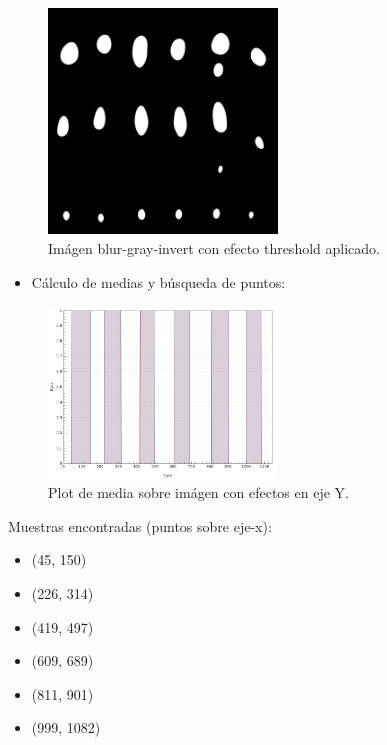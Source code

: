 \begin{figure}[H]
	\vspace{-0.2cm}
	\centering
	\includegraphics[width=230px]{imagenes-jtlc/experimento/search-samples/4-threshold}
	\centering
	\caption{Im\'agen blur-gray-invert con efecto threshold aplicado.}
	\label{fig:font-c-thresh}
	\vspace{-0.15cm}
\end{figure}

\newpage
\begin{itemize}
	\item C\'alculo de medias y b\'usqueda de puntos:
\end{itemize}

\begin{figure}[H]
	\vspace{-0.2cm}
	\centering
	\includegraphics[width=230px]{imagenes-jtlc/experimento/search-samples/plot-y}
	\centering
	\vspace{-0.4cm}
	\caption{Plot de media sobre im\'agen con efectos en eje Y.}
	\label{fig:font-c-plot-y}
	\vspace{-0.15cm}
\end{figure}
Muestras encontradas (puntos sobre eje-x):
\begin{itemize}
	\addtolength{\itemindent}{1cm}
	\item (45, 150)
	\item (226, 314)
	\item (419, 497)
	\item (609, 689)
	\item (811, 901)
	\item (999, 1082)
\end{itemize}


